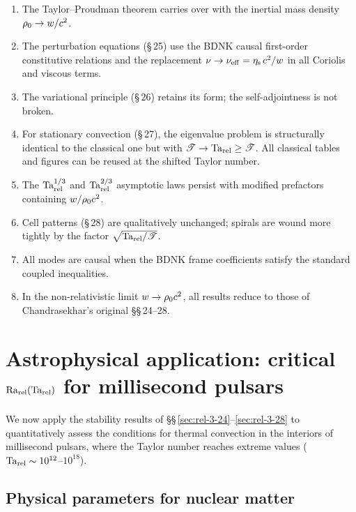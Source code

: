\begin{enumerate}
  \item The Taylor--Proudman theorem carries over with the inertial mass
        density $\rho_0 \to w/c^2$.
  \item The perturbation equations (\S\,25) use the BDNK
        causal first-order constitutive relations and the replacement
        $\nu \to \nu_{\mathrm{eff}} = \eta_{\mathrm{s}}\,c^2/w$
        in all Coriolis and viscous terms.
  \item The variational principle (\S\,26) retains its form; the
        self-adjointness is not broken.
  \item For stationary convection (\S\,27), the eigenvalue problem is
        structurally identical to the classical one but with
        $\mathscr{T} \to \mathrm{Ta}_{\mathrm{rel}} \geq \mathscr{T}$.  All classical
        tables and figures can be reused at the shifted Taylor number.
  \item The $\mathrm{Ta}_{\mathrm{rel}}^{1/3}$ and $\mathrm{Ta}_{\mathrm{rel}}^{2/3}$ asymptotic laws persist
        with modified prefactors containing $w/\rho_0 c^2$.
  \item Cell patterns (\S\,28) are qualitatively unchanged; spirals are
        wound more tightly by the factor $\sqrt{\mathrm{Ta}_{\mathrm{rel}}/\mathscr{T}}$.
  \item All modes are causal when the BDNK frame coefficients
        satisfy the standard coupled inequalities.
  \item In the non-relativistic limit
        $w \to \rho_0 c^2$, all results
        reduce to those of Chandrasekhar's original \S\S\,24--28.
\end{enumerate}


\section{Astrophysical application: critical $\mathrm{Ra}_{\mathrm{rel}}(\mathrm{Ta}_{\mathrm{rel}})$ for
millisecond pulsars}\label{sec:rel-3-app-24-28}

We now apply the stability results of \S\S\,\ref{sec:rel-3-24}--\ref{sec:rel-3-28}
to quantitatively assess the conditions for thermal convection in
the interiors of millisecond pulsars, where the Taylor number reaches
extreme values ($\mathrm{Ta}_{\mathrm{rel}} \sim 10^{12}$--$10^{18}$).

\subsection{Physical parameters for nuclear matter}

